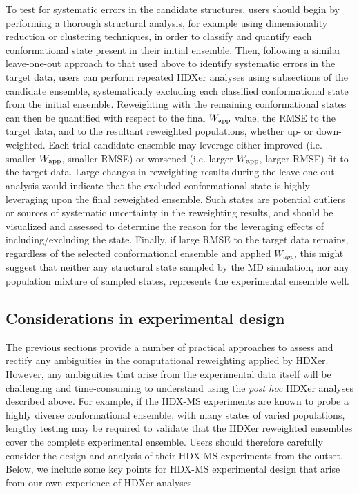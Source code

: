 \documentclass[9pt,tutorial]{livecoms}
\begin{document}
To test for systematic errors in the candidate structures, users should begin by performing a thorough structural analysis, for example using dimensionality reduction or clustering techniques, in order to classify and quantify each conformational state present in their initial ensemble.
Then, following a similar leave-one-out approach to that used above to identify systematic errors in the target data, users can perform repeated HDXer analyses using subsections of the candidate ensemble, systematically excluding each classified conformational state from the initial ensemble. 
Reweighting with the remaining conformational states can then be quantified with respect to the final $W_{\textnormal{app}}$ value, the RMSE to the target data, and to the resultant reweighted populations, whether up- or down-weighted.
Each trial candidate ensemble may leverage either improved (i.e. smaller $W_{\textnormal{app}}$, smaller RMSE) or worsened (i.e. larger $W_{\textnormal{app}}$, larger RMSE) fit to the target data.
Large changes in reweighting results during the leave-one-out analysis would indicate that the excluded conformational state is highly-leveraging upon the final reweighted ensemble.
Such states are potential outliers or sources of systematic uncertainty in the reweighting results, and should be visualized and assessed to determine the reason for the leveraging effects of including/excluding the state.
Finally, if large RMSE to the target data remains, regardless of the selected conformational ensemble and applied $W_{app}$, this might suggest that neither any structural state sampled by the MD simulation, nor any population mixture of sampled states, represents the experimental ensemble well.

\subsection{Considerations in experimental design}\label{expt_design_sect}
The previous sections provide a number of practical approaches to assess and rectify any ambiguities in the computational reweighting applied by HDXer.
However, any ambiguities that arise from the experimental data itself will be challenging and time-consuming to understand using the \textit{post hoc} HDXer analyses described above.
For example, if the HDX-MS experiments are known to probe a highly diverse conformational ensemble, with many states of varied populations, lengthy testing may be required to validate that the HDXer reweighted ensembles cover the complete experimental ensemble.
Users should therefore carefully consider the design and analysis of their HDX-MS experiments from the outset.
Below, we include some key points for HDX-MS experimental design that arise from our own experience of HDXer analyses.
\end{document}
